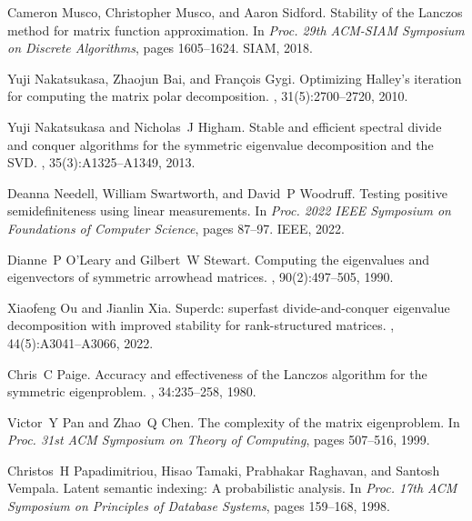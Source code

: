 \documentclass{article}
\begin{document}
\begin{thebibliography}{10}
Cameron Musco, Christopher Musco, and Aaron Sidford.
\newblock Stability of the {L}anczos method for matrix function approximation.
\newblock In {\em Proc. 29th ACM-SIAM Symposium on Discrete Algorithms}, pages 1605--1624. SIAM, 2018.

Yuji Nakatsukasa, Zhaojun Bai, and Fran{\c{c}}ois Gygi.
\newblock Optimizing {H}alley's iteration for computing the matrix polar decomposition.
, 31(5):2700--2720, 2010.

Yuji Nakatsukasa and Nicholas~J Higham.
\newblock Stable and efficient spectral divide and conquer algorithms for the symmetric eigenvalue decomposition and the {SVD}.
, 35(3):A1325--A1349, 2013.

Deanna Needell, William Swartworth, and David~P Woodruff.
\newblock Testing positive semidefiniteness using linear measurements.
\newblock In {\em Proc. 2022 IEEE Symposium on Foundations of Computer Science}, pages 87--97. IEEE, 2022.

Dianne~P O'Leary and Gilbert~W Stewart.
\newblock Computing the eigenvalues and eigenvectors of symmetric arrowhead matrices.
, 90(2):497--505, 1990.

Xiaofeng Ou and Jianlin Xia.
\newblock Superdc: superfast divide-and-conquer eigenvalue decomposition with improved stability for rank-structured matrices.
, 44(5):A3041--A3066, 2022.

Chris~C Paige.
\newblock Accuracy and effectiveness of the {L}anczos algorithm for the symmetric eigenproblem.
, 34:235--258, 1980.

Victor~Y Pan and Zhao~Q Chen.
\newblock The complexity of the matrix eigenproblem.
\newblock In {\em Proc. 31st ACM Symposium on Theory of Computing}, pages 507--516, 1999.

Christos~H Papadimitriou, Hisao Tamaki, Prabhakar Raghavan, and Santosh Vempala.
\newblock Latent semantic indexing: A probabilistic analysis.
\newblock In {\em Proc. 17th ACM Symposium on Principles of Database Systems}, pages 159--168, 1998.


\end{thebibliography}
\end{document}
